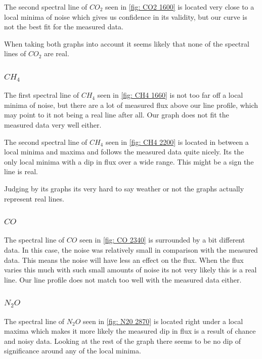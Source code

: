 \documentclass[reprint,english,notitlepage]{revtex4-2}
\begin{document}
The second spectral line of $ CO_2 $ seen in \ref{fig: CO2 1600} is located very close to a local minima of noise which gives us confidence in its validity, but our curve is not the best fit for the measured data. 

When taking both graphs into account it seems likely that none of the spectral lines of $ CO_2 $ are real. 

\subsubsection*{$ CH_4 $}
The first spectral line of $ CH_4 $ seen in \ref{fig: CH4 1660} is not too far off a local minima of noise, but there are a lot of measured flux above our line profile, which may point to it not being a real line after all. Our graph does not fit the measured data very well either. 

The second spectral line of $ CH_4 $ seen in \ref{fig: CH4 2200} is located in between a local minima and maxima and follows the measured data quite nicely. Its the only local minima with a dip in flux over a wide range. This might be a sign the line is real. 

Judging by its graphs its very hard to say weather or not the graphs actually represent real lines. 

\subsubsection*{$ CO $}
The spectral line of $ CO $ seen in \ref{fig: CO 2340} is surrounded by a bit different data. In this case, the noise was relatively small in comparison with the measured data. This means the noise will have less an effect on the flux. When the flux varies this much with such small amounts of noise its not very likely this is a real line. Our line profile does not match too well with the measured data either. 

\subsubsection*{$ N_2O $}
The spectral line of $ N_2O $ seen in \ref{fig: N20 2870} is located right under a local maxima which makes it more likely the measured dip in flux is a result of chance and noisy data. Looking at the rest of the graph there seems to be no dip of significance around any of the local minima. 
\end{document}
